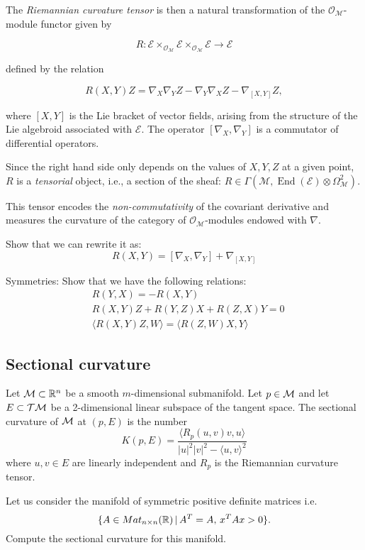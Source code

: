 The \emph{Riemannian curvature tensor} is then a natural transformation of the $\mathcal{O}_{\mathcal{M}}$-module functor given by

\[
R: \mathcal{E} \times_{\mathcal{O}_{\mathcal{M}}} \mathcal{E} \times_{\mathcal{O}_{\mathcal{M}}} \mathcal{E} \to \mathcal{E}
\]

defined by the relation

\[
R(X,Y)Z = \nabla_X \nabla_Y Z - \nabla_Y \nabla_X Z - \nabla_{[X,Y]} Z,
\]

where $[X,Y]$ is the Lie bracket of vector fields, arising from the structure of the Lie algebroid associated with $\mathcal{E}$. The operator $[\nabla_X, \nabla_Y]$ is a commutator of differential operators.


Since the right hand side only depends on the values of $X, Y, Z$ at a given point, $R$ is a \emph{tensorial} object, i.e., a section of the sheaf: $ R \in \Gamma(\mathcal{M}, \operatorname{End}(\mathcal{E}) \otimes \Omega^2_{\mathcal{M}})$.


This tensor encodes the \textit{non-commutativity} of the covariant derivative and measures the curvature of the category of $\mathcal{O}_{\mathcal{M}}$-modules endowed with $\nabla$.


\begin{ex}\label{Ex:con1}
Show that we can rewrite it as: $$R(X,Y)=[\nabla_X,\nabla_Y]+\nabla_{[X,Y]}$$
\end{ex}
\begin{ex}\label{Ex:con2}
Symmetries: 
Show that we have the following relations: 
\begin{align}
&R(Y,X)=-R(X,Y) \\
&R(X,Y)Z+R(Y,Z)X+R(Z,X)Y=0\\
&\langle   R(X,Y)Z, W\rangle= \langle   R(Z,W)X, Y\rangle
\end{align}
\end{ex}
\subsection{Sectional curvature}
Let $\mathcal{M}\subset \mathbb{R}^n$ be a smooth $m$-dimensional submanifold. 
Let $p\in \mathcal{M}$ and let $E\subset \mathcal{T}\mathcal{M}$ be a 2-dimensional linear subspace of the tangent space. 
The sectional curvature of $\mathcal{M}$ at $(p,E)$ is the number 
\[K(p,E)=\frac{\langle R_p(u,v)v,u\rangle }{|u|^2|v|^2-\langle u,v\rangle^2 }\]
where $u,v\in E$ are linearly independent and $R_p$ is the Riemannian curvature tensor. 

\begin{ex}
    Let us consider the manifold of symmetric positive definite matrices i.e. 
    \[\{A\in Mat_{n\times n}(\mathbb{R})\, |\, A^T=A,\,  x^TAx>0 \}.\]
    Compute the sectional curvature for this manifold.
\end{ex}

